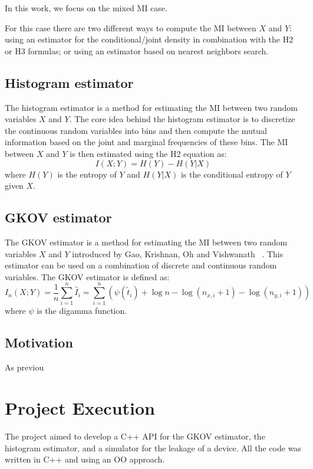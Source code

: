 \documentclass[12pt]{article}
\begin{document}
    In this work, we focus on the mixed MI case.

    For this case there are two different ways to compute the MI between $X$ and $Y$: using an estimator for the conditional/joint density in combination with the H2 or H3 formulas; or using an estimator based on nearest neighbors search.

    \subsection{Histogram estimator}\label{subsec:hist}
    The histogram estimator is a method for estimating the MI between two random variables $X$ and $Y$.
    The core idea behind the histogram estimator is to discretize the continuous random variables into bins and then compute the mutual information based on the joint and marginal frequencies of these bins.
    The MI between $X$ and $Y$ is then estimated using the H2 equation as:
    \begin{equation}
        I(X;Y) = H(Y) - H(Y|X)\label{eq:hist}
    \end{equation}
    where $H(Y)$ is the entropy of $Y$ and $H(Y|X)$ is the conditional entropy of $Y$ given $X$.

    \subsection{GKOV estimator}\label{subsec:gkov}
    The GKOV estimator is a method for estimating the MI between two random variables $X$ and $Y$ introduced by Gao, Krishnan, Oh and Vishwanath ~\cite{gkov}.
    This estimator can be used on a combination of discrete and continuous random variables.
    The GKOV estimator is defined as:
    \begin{equation}
        I_n(X;Y) = \frac{1}{n} \sum_{i=1}^n \hat{I}_i = \sum_{i=1}^n \left( \psi(\tilde{t}_i) + \log n - \log(n_{x,i}+1) - \log(n_{y,i}+1) \right)\label{eq:gkov}
    \end{equation}
    where $\psi$ is the digamma function.

    \subsection{Motivation}\label{subsec:motivation}
    As previou

    \section{Project Execution}\label{sec:execution}
    The project aimed to develop a C++ API for the GKOV estimator, the histogram estimator, and a simulator for the leakage of a device.
    All the code was written in C++ and using an OO approach.
\end{document}
